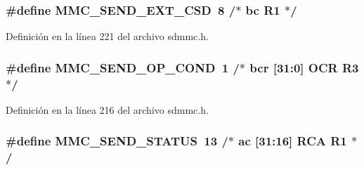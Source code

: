 \subsubsection[{\texorpdfstring{M\+M\+C\+\_\+\+S\+E\+N\+D\+\_\+\+E\+X\+T\+\_\+\+C\+SD}{MMC_SEND_EXT_CSD}}]{\setlength{\rightskip}{0pt plus 5cm}\#define M\+M\+C\+\_\+\+S\+E\+N\+D\+\_\+\+E\+X\+T\+\_\+\+C\+SD~8		/$\ast$ bc                      R1  $\ast$/}\hypertarget{group___c_h_i_p___s_d_m_m_c___definitions_ga99c5e064412194f85d8009e48332230d}{}\label{group___c_h_i_p___s_d_m_m_c___definitions_ga99c5e064412194f85d8009e48332230d}


Definición en la línea 221 del archivo sdmmc.\+h.

\subsubsection[{\texorpdfstring{M\+M\+C\+\_\+\+S\+E\+N\+D\+\_\+\+O\+P\+\_\+\+C\+O\+ND}{MMC_SEND_OP_COND}}]{\setlength{\rightskip}{0pt plus 5cm}\#define M\+M\+C\+\_\+\+S\+E\+N\+D\+\_\+\+O\+P\+\_\+\+C\+O\+ND~1		/$\ast$ bcr  \mbox{[}31\+:0\mbox{]}  O\+CR        R3  $\ast$/}\hypertarget{group___c_h_i_p___s_d_m_m_c___definitions_ga84fa553012e25291f05e4c4be438d78a}{}\label{group___c_h_i_p___s_d_m_m_c___definitions_ga84fa553012e25291f05e4c4be438d78a}


Definición en la línea 216 del archivo sdmmc.\+h.

\subsubsection[{\texorpdfstring{M\+M\+C\+\_\+\+S\+E\+N\+D\+\_\+\+S\+T\+A\+T\+US}{MMC_SEND_STATUS}}]{\setlength{\rightskip}{0pt plus 5cm}\#define M\+M\+C\+\_\+\+S\+E\+N\+D\+\_\+\+S\+T\+A\+T\+US~13		/$\ast$ ac   \mbox{[}31\+:16\mbox{]} R\+CA        R1  $\ast$/}\hypertarget{group___c_h_i_p___s_d_m_m_c___definitions_gaccf43154387f91ebfb4bc63b96fcb1bf}{}\label{group___c_h_i_p___s_d_m_m_c___definitions_gaccf43154387f91ebfb4bc63b96fcb1bf}



